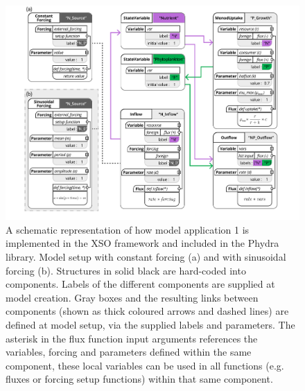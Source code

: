 \documentclass[journal abbreviation, manuscript]{copernicus}
\begin{document}
\begin{figure}[t]
\includegraphics[width=15cm]{Figures/firstdraft_schematics/code_schematics/Chemostat.pdf}
\caption{A schematic representation of how model application 1 is implemented in the XSO framework and included in the Phydra library. Model setup with constant forcing (a) and with sinusoidal forcing (b). Structures in solid black are hard-coded into components. Labels of the different components are supplied at model creation. Gray boxes and the resulting links between components (shown as thick coloured arrows and dashed lines) are defined at model setup, via the supplied labels and parameters. The asterisk in the flux function input arguments references the variables, forcing and parameters defined within the same component, these local variables can be used in all functions (e.g. fluxes or forcing setup functions) within that same component.}
\label{Figure:CodeSchematics_1}
\end{figure}
\end{document}

